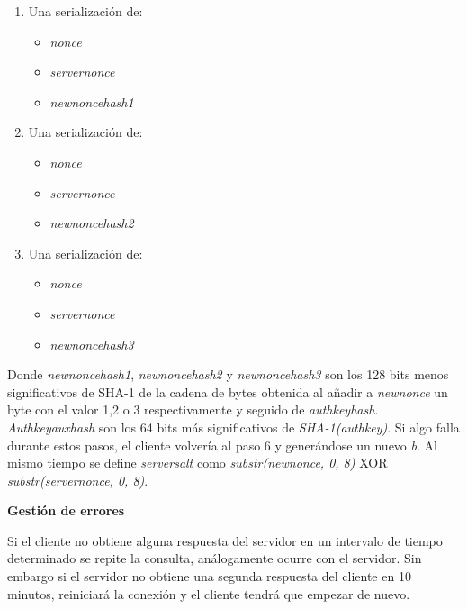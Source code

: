 \begin{enumerate}
	\begin{enumerate}
		\item Una serialización de: 
			\begin{itemize}
				\item \emph{nonce}
				\item \emph{server\textunderscore nonce}
				\item \emph{new\textunderscore nonce\textunderscore hash1}
			\end{itemize}
		\item Una serialización de:
			\begin{itemize}
				\item \emph{nonce}	
				\item \emph{server\textunderscore nonce}
				\item \emph{new\textunderscore nonce\textunderscore hash2}
			\end{itemize}
		\item Una serialización de:
			\begin{itemize}
				\item \emph{nonce}	
				\item \emph{server\textunderscore nonce}
				\item \emph{new\textunderscore nonce\textunderscore hash3}
			\end{itemize}
	\end{enumerate}
	Donde \emph{new\textunderscore nonce\textunderscore hash1}, \emph{new\textunderscore nonce\textunderscore hash2} y \emph{new\textunderscore nonce\textunderscore hash3} son los 128 bits menos significativos de SHA-1 de la cadena de bytes obtenida al añadir a \emph{new\textunderscore nonce} un byte con el valor 1,2 o 3 respectivamente y seguido de \emph{auth\textunderscore key\textunderscore hash}.\\
	\emph{Auth\textunderscore key\textunderscore aux\textunderscore hash} son los 64 bits más significativos de \emph{SHA-1(auth\textunderscore key)}.
	Si algo falla durante estos pasos, el cliente volvería al paso 6 y generándose un nuevo \emph{b}. Al mismo tiempo se define \emph{server\textunderscore salt} como \emph{substr(new\textunderscore nonce, 0, 8)} XOR \emph{substr(server\textunderscore nonce, 0, 8)}.\\
	
\end{enumerate}
\textbf{Gestión de errores}

Si el cliente no obtiene alguna respuesta del servidor en un intervalo de tiempo determinado se repite la consulta, análogamente ocurre con el servidor. Sin embargo si el servidor no obtiene una segunda respuesta del cliente en 10 minutos, reiniciará la conexión y el cliente tendrá que empezar de nuevo.


